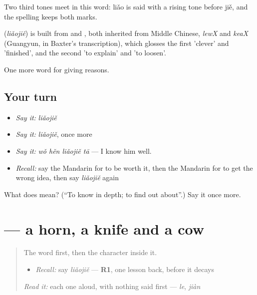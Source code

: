 Two third tones meet in this word: liǎo is said with a rising tone before jiě, and the spelling keeps both marks.

\begin{cousinweb}
\textbf{} (\emph{liǎojiě}) is built from  and , both inherited from Middle Chinese, \emph{lewX} and \emph{keaX} (Guangyun, in Baxter's transcription), which glosses the first 'clever' and 'finished', and the second 'to explain' and 'to loosen'.
\end{cousinweb}

\begin{grammarlens}[title={What you've built}]
One more word for giving reasons.
\end{grammarlens}

\subsection*{Your turn}
\begin{itemize}
\raggedright
  \item \emph{Say it:} \emph{liǎojiě}
  \item \emph{Say it:} \emph{liǎojiě}, once more
  \item \emph{Say it:} \emph{wǒ hěn liǎojiě tā} — I know him well.
  \item \emph{Recall:} say the Mandarin for to be worth it, then the Mandarin for to get the wrong idea, then say \emph{liǎojiě} again
\end{itemize}

\begin{tcolorbox}[breakable,colback=teal!4,colframe=teal!35!black,title={Before you move on}]
What does  mean? (\textquotedblleft{}To know in depth; to find out about\textquotedblright{}.) Say it once more.
\end{tcolorbox}
\section[\texorpdfstring{\zh{解} (jiě)}{解 (jiě)}]{ — a horn, a knife and a cow}

\label{lesson:ZH-W367-jie-untie}



\begin{quote}
The word first, then the character inside it.

\begin{itemize}
\raggedright
  \item \emph{Recall:} say \emph{liǎojiě} — \textbf{R1}, one lesson back, before it decays
\end{itemize}

\begin{quote}
 
\end{quote}

\emph{Read it:} each one aloud, with nothing said first — \emph{le}, \emph{jiàn}
\end{quote}


